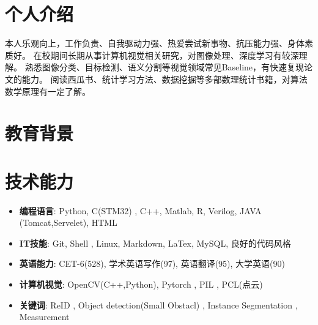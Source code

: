 \documentclass{resume}
\begin{document}


 
\section{个人介绍}
本人乐观向上，工作负责、自我驱动力强、热爱尝试新事物、抗压能力强、身体素质好。
在校期间长期从事计算机视觉相关研究，对图像处理、深度学习有较深理解。
熟悉图像分类、目标检测、语义分割等视觉领域常见Baseline，有快速复现论文的能力。
阅读西瓜书、统计学习方法、数据挖掘等多部数理统计书籍，对算法数学原理有一定了解。


\section{教育背景}

\section{技术能力}
\begin{itemize}[parsep=0.2ex]
  \item \textbf{编程语言}: Python, C(STM32) , C++, Matlab, R, Verilog, JAVA (Tomcat,Servelet), HTML
  \item \textbf{IT技能}: Git, Shell , Linux, Markdown, LaTex, MySQL, 良好的代码风格
  \item \textbf{英语能力}: CET-6(528), 学术英语写作(97), 英语翻译(95), 大学英语(90)
  \item \textbf{计算机视觉}: OpenCV(C++,Python), Pytorch , PIL , PCL(点云) 
  \item \textbf{关键词}: ReID , Object detection(Small Obstacl) , Instance Segmentation , Measurement
\end{itemize}
\end{document}

